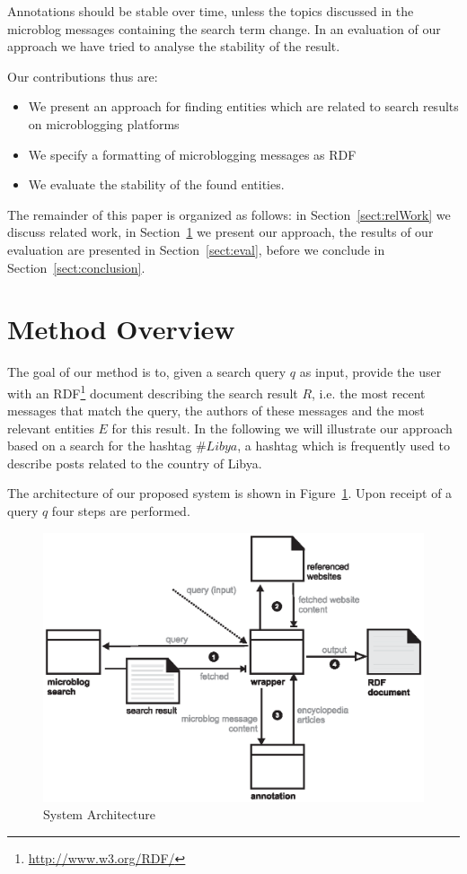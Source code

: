 \documentclass{llncs}
\begin{document}
Annotations should be stable over time, unless the topics discussed in the microblog messages containing the search term change. In an evaluation of our approach we have tried to analyse the stability of the result.

Our contributions thus are:
\begin{itemize}
	\item We present an approach for finding entities which are related to search results on microblogging platforms
	\item We specify a formatting of microblogging messages as RDF
	\item We evaluate the stability of the found entities.
\end{itemize}

The remainder of this paper is organized as follows: in Section~\ref{sect:relWork} we discuss related work, in Section~\ref{sect:method} we present our approach, the results of our evaluation are presented in Section~\ref{sect:eval}, before we conclude in Section~\ref{sect:conclusion}.






\section{Method Overview}
\label{sect:method}

The goal of our method is to, given a search query $q$ as input, provide the user with an RDF\footnote{\url{http://www.w3.org/RDF/}} document describing the search result $R$, i.e. the most recent messages that match the query, the authors of these messages and the most relevant entities $E$ for this result. 
In the following we will illustrate our approach based on a search for the hashtag $\#Libya$, a hashtag
which is frequently used to describe posts related to the country of Libya.

The architecture of our proposed system is shown in Figure~\ref{fig:arch}. Upon
receipt of a query $q$ four steps are performed. 

\begin{figure}[htb]
  \centering
  \includegraphics[width=.7\linewidth]{architecture}
  \caption{System Architecture}
  \label{fig:arch}
\end{figure}
\end{document}
